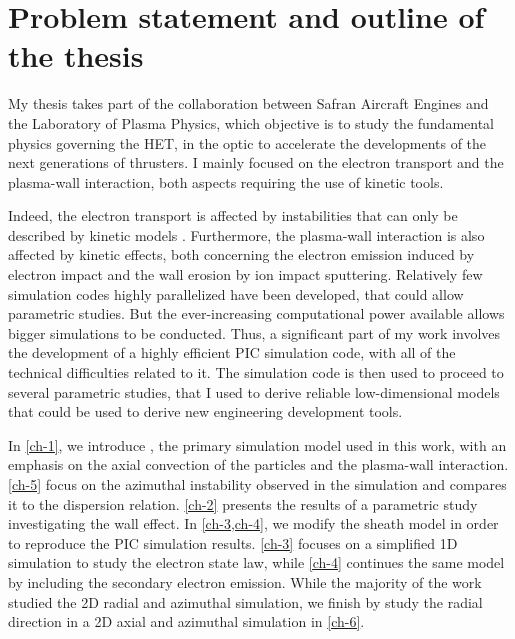 
\section{Problem statement and outline of the thesis}
\label{sec-problematic}

My thesis takes part of the collaboration between Safran Aircraft Engines and the Laboratory of Plasma Physics, which objective is to study the fundamental physics governing the \ac{HET}, in the optic to accelerate the developments of the next generations of thrusters.
I mainly focused on the electron transport and the plasma-wall interaction,
both aspects requiring the use of kinetic tools.

Indeed, the electron transport is affected by instabilities that can only be described by kinetic models \citep{adam2008a,lafleur2016a}.
Furthermore, the plasma-wall interaction is also affected by kinetic effects, both concerning the electron emission induced by electron impact \citep{barral2003a,raitses2011,sydorenko2006} and the wall erosion by ion impact sputtering.
Relatively few simulation codes highly parallelized have been developed, that could allow parametric studies.
But the ever-increasing computational power available allows bigger simulations to be conducted.
Thus, a significant part of my work involves the development of a highly efficient \ac{PIC} simulation code, with all of the technical difficulties related to it.
The simulation code is then used to proceed to several parametric studies, that I used to derive reliable low-dimensional models that could be used to derive new engineering development tools.


\vspace{1em}
In \cref{ch-1}, we introduce \LPPic, the primary simulation model used in this work, with an emphasis on the axial convection of the particles and the plasma-wall interaction.
\cref{ch-5} focus on the azimuthal instability observed in the simulation and compares it to the dispersion relation.
\cref{ch-2} presents the results of a parametric study investigating the wall effect.
In \cref{ch-3,ch-4}, we modify the sheath model in order to reproduce the \ac{PIC} simulation results.
\cref{ch-3} focuses on a simplified \ac{1D} simulation to study the electron state law, while \cref{ch-4} continues the same model by including the secondary electron emission.
While the majority of the work studied the \ac{2D} radial and azimuthal simulation, we finish by study the radial direction in a \ac{2D} axial and azimuthal simulation in \cref{ch-6}.